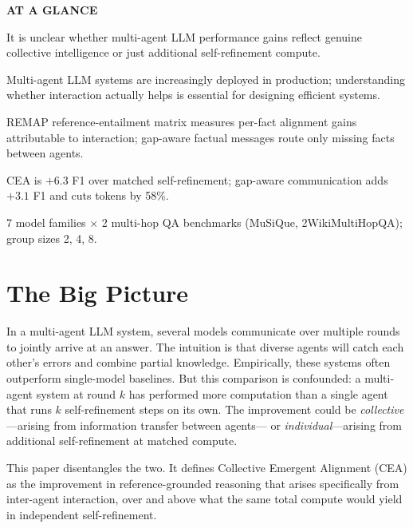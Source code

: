 \documentclass[10pt,twocolumn]{article}
\begin{document}
\begin{mdframed}[backgroundcolor=boxgray,linecolor=rulered,linewidth=1pt,
    innerleftmargin=6pt,innerrightmargin=6pt,
    innertopmargin=6pt,innerbottommargin=6pt]
\textbf{\small AT A GLANCE}\par\vspace{4pt}
\begin{description}[leftmargin=0pt,labelsep=4pt,itemsep=2pt,parsep=0pt,
    font=\small\bfseries]
  \item[Problem:] It is unclear whether multi-agent LLM performance
    gains reflect genuine collective intelligence or just additional
    self-refinement compute.
  \item[Why it matters:] Multi-agent LLM systems are increasingly
    deployed in production; understanding whether interaction
    actually helps is essential for designing efficient systems.
  \item[Method:] REMAP reference-entailment matrix measures per-fact
    alignment gains attributable to interaction; gap-aware factual
    messages route only missing facts between agents.
  \item[Result:] CEA is $+6.3$ F1 over matched self-refinement;
    gap-aware communication adds $+3.1$ F1 and cuts tokens by 58\%.
  \item[Evidence:] 7 model families $\times$ 2 multi-hop QA benchmarks
    (MuSiQue, 2WikiMultiHopQA); group sizes 2, 4, 8.
\end{description}
\end{mdframed}

\section{The Big Picture}

In a multi-agent LLM system, several models communicate over multiple
rounds to jointly arrive at an answer. The intuition is that diverse
agents will catch each other's errors and combine partial knowledge.
Empirically, these systems often outperform single-model baselines.
But this comparison is confounded: a multi-agent system at round $k$
has performed more computation than a single agent that runs $k$
self-refinement steps on its own. The improvement could be
\emph{collective}---arising from information transfer between agents---
or \emph{individual}---arising from additional self-refinement
at matched compute.

This paper disentangles the two. It defines Collective Emergent
Alignment (CEA) as the improvement in reference-grounded reasoning
that arises specifically from inter-agent interaction, over and above
what the same total compute would yield in independent self-refinement.
\end{document}
